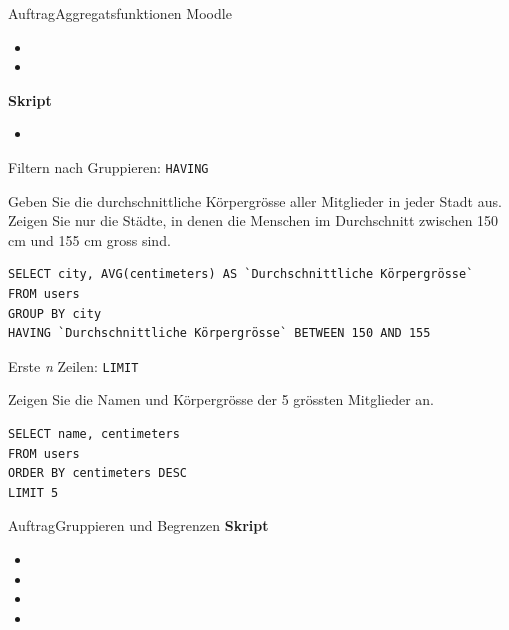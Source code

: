 \begin{frame}{Auftrag}{Aggregatsfunktionen}
  \small
  Moodle
  \begin{itemize}
    \item {}
    \item {}
  \end{itemize}
  \textbf{Skript}
  \begin{itemize}
    \item {}
  \end{itemize}
\end{frame}

\begin{frame}[fragile]{Filtern nach Gruppieren: \lstinline|HAVING|}
  \small
  \begin{mychallenge}
    Geben Sie die durchschnittliche Körpergrösse aller Mitglieder in jeder Stadt aus. Zeigen Sie nur die Städte, in denen die Menschen im Durchschnitt zwischen 150 cm und 155 cm gross sind.
    \pause
    \begin{myanswer}
      \begin{lstlisting}
SELECT city, AVG(centimeters) AS `Durchschnittliche Körpergrösse`
FROM users
GROUP BY city
HAVING `Durchschnittliche Körpergrösse` BETWEEN 150 AND 155
\end{lstlisting}
    \end{myanswer}
  \end{mychallenge}
\end{frame}

\begin{frame}[fragile]{Erste \textit{n} Zeilen: \lstinline|LIMIT|}
  \begin{myexercise}
    Zeigen Sie die Namen und Körpergrösse der 5 grössten Mitglieder an.
    \pause
    \begin{myanswer}
      \begin{lstlisting}
SELECT name, centimeters
FROM users
ORDER BY centimeters DESC
LIMIT 5
\end{lstlisting}
    \end{myanswer}
  \end{myexercise}
\end{frame}

\begin{frame}{Auftrag}{Gruppieren und Begrenzen}
  \textbf{Skript}
  \begin{itemize}
    \item {}
    \item {}
    \item {}
    \item {}
  \end{itemize}
\end{frame}

